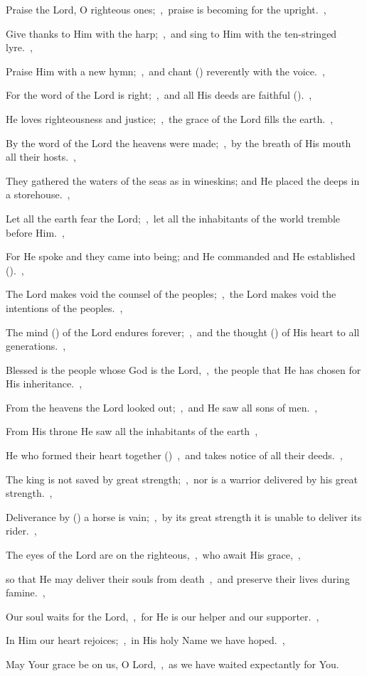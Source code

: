 \documentclass[12pt,twoside,a5paper]{article}
\begin{document}
\begin{normalparskip}
  Praise the Lord, O righteous ones;~\sep\ praise is becoming for the upright.~\sep


  Give thanks to Him with the harp;~\sep\ and sing to Him with the ten-stringed lyre.~\sep

  Praise Him with a new hymn;~\sep\ and chant () reverently with the voice.~\sep

  For the word of the Lord is right;~\sep\ and all His deeds are faithful ().~\sep

  He loves righteousness and justice;~\sep\ the grace of the Lord fills the earth.~\sep

  By the word of the Lord the heavens were made;~\sep\ by the breath of His mouth all their hosts.~\sep

  They gathered the waters of the seas as in wineskins; and He placed the deeps in a storehouse.~\sep

  Let all the earth fear the Lord;~\sep\ let all the inhabitants of the world tremble before Him.~\sep

  For He spoke and they came into being; and He commanded and He established ().~\sep

  The Lord makes void the counsel of the peoples;~\sep\ the Lord makes void the intentions of the peoples.~\sep

  The mind () of the Lord endures forever;~\sep\ and the thought () of His heart to all generations.~\sep

  Blessed is the people whose God is the Lord,~\sep\ the people that He has chosen for His inheritance.~\sep

  From the heavens the Lord looked out;~\sep\ and He saw all sons of men.~\sep

  From His throne He saw all the inhabitants of the earth~\sep

  He who formed their heart together ()~\sep\ and takes notice of all their deeds.~\sep

  The king is not saved by great strength;~\sep\ nor is a warrior delivered by his great strength.~\sep

  Deliverance by () a horse is vain;~\sep\ by its great strength it is unable to deliver its rider.~\sep

  The eyes of the Lord are on the righteous,~\sep\ who await His grace,~\sep

  so that He may deliver their souls from death~\sep\ and preserve their lives during famine.~\sep

  Our soul waits for the Lord,~\sep\ for He is our helper and our supporter.~\sep

  In Him our heart rejoices;~\sep\ in His holy Name we have hoped.~\sep

  May Your grace be on us, O Lord,~\sep\ as we have waited expectantly for You.
\end{normalparskip}
\end{document}
